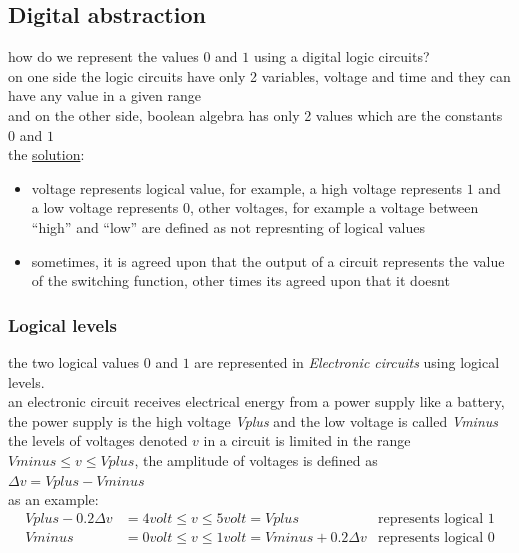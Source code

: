 \documentclass[a4paper,12pt]{article}
\begin{document}
\subsection{Digital abstraction}
\label{sec:orgce1c66e}

how do we represent the values \(0\) and \(1\) using a digital logic circuits?\\

on one side the logic circuits have only 2 variables, voltage and time and they can have any value in a given range\\

and on the other side, boolean algebra has only 2 values which are the constants \(0\) and \(1\)\\

the \uline{solution}:\\

\begin{itemize}
\item voltage represents logical value, for example, a high voltage represents \(1\) and a low voltage represents \(0\), other voltages, for example a voltage between ``high'' and ``low'' are defined as not represnting of logical values\\
\item sometimes, it is agreed upon that the output of a circuit represents the value of the switching function, other times its agreed upon that it doesnt\\
\end{itemize}

\subsubsection{Logical levels}
\label{sec:orgd752773}

the two logical values \(0\) and \(1\) are represented in \emph{Electronic circuits} using logical levels.\\

an electronic circuit receives electrical energy from a power supply like a battery, the power supply is the high voltage \emph{Vplus} and the low voltage is called \emph{Vminus}\\

the levels of voltages denoted \(v\) in a circuit is limited in the range \(Vminus \leq v \leq Vplus\), the amplitude of voltages is defined as \(\Delta{v} = Vplus - Vminus\)\\

as an example:\\

\begin{align*}
  Vplus - 0.2\Delta{v} &= 4volt \leq v \leq 5volt = Vplus & \text{represents logical $1$}\\
  Vminus &= 0volt \leq v \leq 1volt = Vminus + 0.2\Delta{v} & \text{represents logical $0$}
\end{align*}
\end{document}
